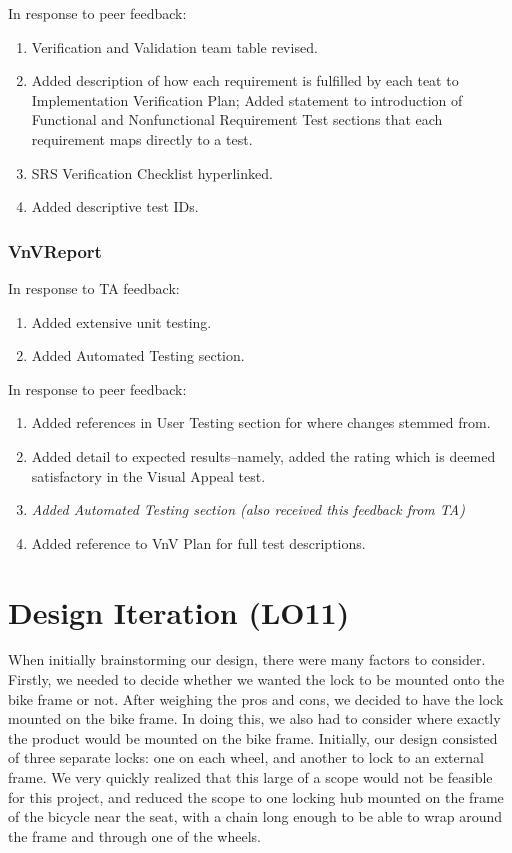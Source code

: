 \documentclass{article}
\begin{document}
\noindent In response to peer feedback:
\begin{enumerate}
    \item Verification and Validation team table revised.
    \item Added description of how each requirement is fulfilled by each teat to Implementation Verification Plan; Added statement to introduction of Functional and Nonfunctional Requirement Test sections that each requirement maps directly to a test.
    \item SRS Verification Checklist hyperlinked.
    \item Added descriptive test IDs.
\end{enumerate}

\subsubsection{VnVReport}
In response to TA feedback:
\begin{enumerate}
    \item Added extensive unit testing.
    \item Added Automated Testing section.
\end{enumerate}

\noindent In response to peer feedback:
\begin{enumerate}
    \item Added references in User Testing section for where changes stemmed from.
    \item Added detail to expected results--namely, added the rating which is deemed satisfactory in the Visual Appeal test.
    \item \textit{Added Automated Testing section (also received this feedback from TA)}
    \item Added reference to VnV Plan for full test descriptions.
\end{enumerate}


\section{Design Iteration (LO11)} 

When initially brainstorming our design, there were many factors to consider. Firstly, we needed to decide whether we wanted the lock to be mounted onto the bike frame or not. After weighing the pros and cons, we decided to have the lock mounted on the bike frame. In doing this, we also had to consider where exactly the product would be mounted on the bike frame. Initially, our design consisted of three separate locks: one on each wheel, and another to lock to an external frame. We very quickly realized that this large of a scope would not be feasible for this project, and reduced the scope to one locking hub mounted on the frame of the bicycle near the seat, with a chain long enough to be able to wrap around the frame and through one of the wheels.
\end{document}
